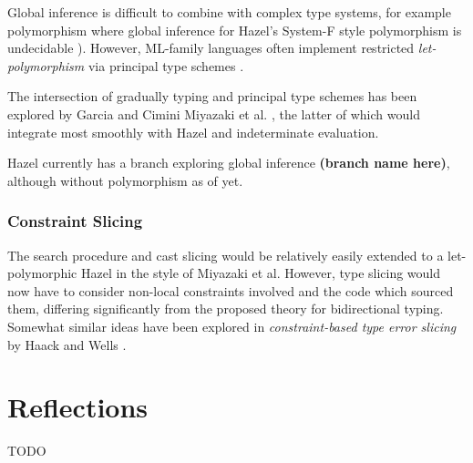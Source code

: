 Global inference is difficult to combine with complex type systems, for example polymorphism where global inference for Hazel's System-F style polymorphism is undecidable \cite{SystemFUndecidable}). However, ML-family languages often implement restricted \textit{let-polymorphism} via principal type schemes \cite{PrincipalTypeSchemes}.

The intersection of gradually typing and principal type schemes has been explored by Garcia and Cimini \cite{GradualTI} Miyazaki et al. \cite{DTI}, the latter of which would integrate most smoothly with Hazel and indeterminate evaluation. 

Hazel currently has a branch exploring global inference \textbf{(branch name here)}, although without polymorphism as of yet.

\subsubsection{Constraint Slicing}
The search procedure and cast slicing would be relatively easily extended to a let-polymorphic Hazel in the style of Miyazaki et al. However, type slicing would now have to consider non-local constraints involved and the code which sourced them, differing significantly from the proposed theory for bidirectional typing. Somewhat similar ideas have been explored in \textit{constraint-based type error slicing} by Haack and Wells \cite{HaackErrSlice}.

\section{Reflections}
TODO